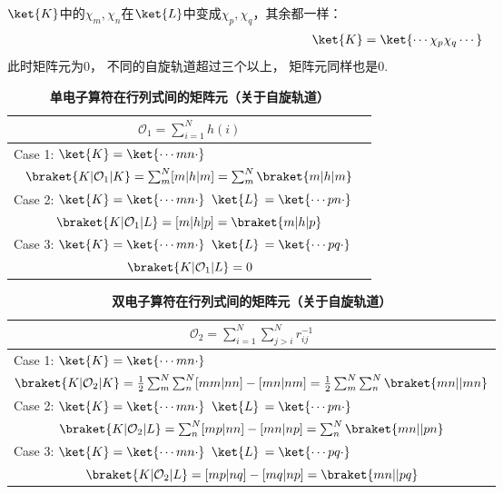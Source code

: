 $\ket{K}$中的$\chi_m,\chi_n$在$\ket{L}$中变成$\chi_p,\chi_q$，其余都一样：
\begin{align}
\ket{K}=\ket{\cdots\chi_p\chi_q\cdots}
\end{align}
此时矩阵元为0，
不同的自旋轨道超过三个以上，
矩阵元同样也是0.


\begin{table}[h]
	\renewcommand\arraystretch{1.7}
	\centering
	\caption{\bf 单电子算符在行列式间的矩阵元（关于自旋轨道）}
	\label{t2.3}
	\begin{tabularx}{\textwidth}{lY}
		\hline
		 \\\hline
		Case 1: $\ket{K}=\ket{\cdots mn\cdot}$&\\
		\\
		Case 2: \parbox[t]{.5\textwidth}{
		$\ket{K}=\ket{\cdots mn\cdot}$\\
		$\ket{L}\,=\ket{\cdots pn\cdot}$
			}&	\\
		\\
		Case 3: \parbox[t]{5cm}{
			$\ket{K}=\ket{\cdots mn\cdot}$\\
			$\ket{L}\,=\ket{\cdots pq\cdot}$}& \\
		\\\hline
		
	\end{tabularx}
\end{table}

\begin{table}[h]
	\renewcommand\arraystretch{1.7}
	\centering
	\caption{\bf 双电子算符在行列式间的矩阵元（关于自旋轨道）}
	\label{t2.4}
	\begin{tabularx}{\textwidth}{lY}
		\hline
		\\\hline
		Case 1: $\ket{K}=\ket{\cdots mn\cdot}$&\\
		\\
		Case 2: \parbox[t]{5cm}{
			$\ket{K}=\ket{\cdots mn\cdot}$\\
			$\ket{L}\,=\ket{\cdots pn\cdot}$
		}	&\\
		\\
		Case 3: \parbox[t]{5cm}{
			$\ket{K}=\ket{\cdots mn\cdot}$\\
			$\ket{L}\,=\ket{\cdots pq\cdot}$}&\\
		\\\hline
	\end{tabularx}
\end{table}


